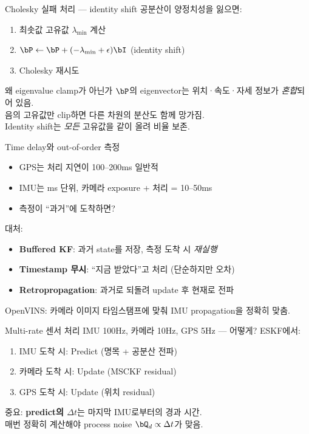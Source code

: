 \begin{frame}{Cholesky 실패 처리 — identity shift}
  공분산이 양정치성을 잃으면:
  \vspace{0.2em}
  \begin{enumerate}
    \item 최솟값 고유값 $\lambda_{\min}$ 계산
    \item $\bP \leftarrow \bP + (-\lambda_{\min} + \epsilon)\bI$ (identity shift)
    \item Cholesky 재시도
  \end{enumerate}
  \pause
  \vspace{0.3em}
  \begin{block}{왜 eigenvalue clamp가 아닌가}
    $\bP$의 eigenvector는 위치·속도·자세 정보가 \emph{혼합}되어 있음. \\
    음의 고유값만 clip하면 다른 차원의 분산도 함께 망가짐. \\
    Identity shift는 \emph{모든} 고유값을 같이 올려 비율 보존.
  \end{block}
\end{frame}

\begin{frame}{Time delay와 out-of-order 측정}
  \begin{itemize}
    \item GPS는 처리 지연이 100--200ms 일반적
    \item IMU는 ms 단위, 카메라 exposure + 처리 = 10--50ms
    \item 측정이 ``과거''에 도착하면?
  \end{itemize}
  \pause
  \vspace{0.3em}
  대처:
  \begin{itemize}
    \item \textbf{Buffered KF}: 과거 state를 저장, 측정 도착 시 \emph{재실행}
    \item \textbf{Timestamp 무시}: ``지금 받았다''고 처리 (단순하지만 오차)
    \item \textbf{Retropropagation}: 과거로 되돌려 update 후 현재로 전파
  \end{itemize}
  \pause
  \vspace{0.2em}
  OpenVINS: 카메라 이미지 타임스탬프에 맞춰 IMU propagation을 정확히 맞춤.
\end{frame}

\begin{frame}{Multi-rate 센서 처리}
  IMU 100Hz, 카메라 10Hz, GPS 5Hz — 어떻게?
  \pause
  \vspace{0.3em}
  ESKF에서:
  \begin{enumerate}
    \item IMU 도착 시: Predict (명목 + 공분산 전파)
    \item 카메라 도착 시: Update (MSCKF residual)
    \item GPS 도착 시: Update (위치 residual)
  \end{enumerate}
  \pause
  \vspace{0.3em}
  중요: \textbf{predict의 $\Delta t$}는 마지막 IMU로부터의 경과 시간.\\
  매번 정확히 계산해야 process noise $\bQ_d \propto \Delta t$가 맞음.
\end{frame}

